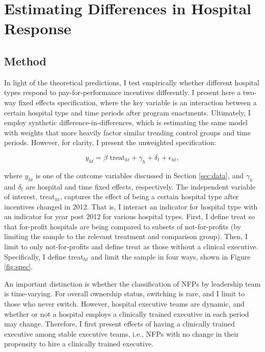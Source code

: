 \documentclass[12pt]{article}
\begin{document}
    \section{Estimating Differences in Hospital Response}

    \subsection{Method}

    In light of the theoretical predictions, I test empirically whether different hospital types respond to pay-for-performance incentives differently. I present here a two-way fixed effects specification, where the key variable is an interaction between a certain hospital type and time periods after program enactments. Ultimately, I employ synthetic difference-in-differences, which is estimating the same model with weights that more heavily factor similar trending control groups and time periods. However, for clarity, I present the unweighted specification:

    \begin{equation}
    \label{eq:forprofit}
    y_{ht} = \beta \text{ treat}_{ht} + \gamma_{h} + \delta_t + \epsilon_{ht},
    \end{equation}
    

    \noindent where $y_{ht}$ is one of the outcome variables discussed in Section \ref{sec:data}, and $\gamma_h$ and $\delta_t$ are hospital and time fixed effects, respectively. The independent variable of interest, treat$_{ht}$, captures the effect of being a certain hospital type after incentives changed in 2012. That is, I interact an indicator for hospital type with an indicator for year post 2012 for various hospital types. First, I define treat so that for-profit hospitals are being compared to subsets of not-for-profits (by limiting the sample to the relevant treatment and comparison group). Then, I limit to only not-for-profits and define treat as those without a clinical executive. Specifically, I define treat$_{ht}$ and limit the sample in four ways, shown in Figure \ref{fig:spec}. 

    An important distinction is whether the classification of NFPs by leadership team is time-varying. For overall ownership status, switching is rare, and I limit to those who never switch. However, hospital executive teams are dynamic, and whether or not a hospital employs a clinically trained executive in each period may change. Therefore, I first present effects of having a clinically trained executive among stable executive teams, i.e., NFPs with no change in their propensity to hire a clinically trained executive. 
\end{document}
